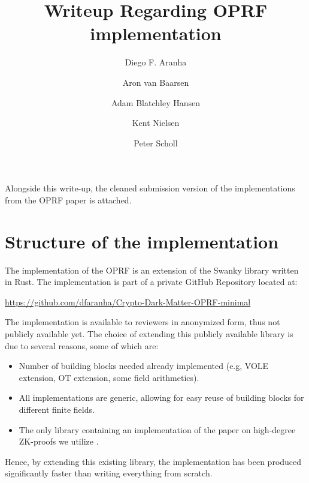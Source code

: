 \documentclass{article}
\title{Writeup Regarding OPRF implementation}
\author{Diego F. Aranha \and Aron van Baarsen \and Adam Blatchley Hansen \and Kent Nielsen \and Peter Scholl}
\begin{document}
\maketitle

Alongside this write-up, the cleaned submission version of the implementations from the OPRF paper is attached.

\section{Structure of the implementation}
The implementation of the OPRF is an extension of the Swanky library \cite{swanky} written in Rust.
The implementation is part of a private GitHub Repository located at:
\begin{center}
    \url{https://github.com/dfaranha/Crypto-Dark-Matter-OPRF-minimal}
\end{center}
The implementation is available to reviewers in anonymized form, thus not publicly available yet. 
The choice of extending this publicly available library is due to several reasons, some of which are:
\begin{itemize}
    \item Number of building blocks needed already implemented (e.g, VOLE extension, OT extension, some field arithmetics).
    \item All implementations are generic, allowing for easy reuse of building blocks for different finite fields.
    \item The only library containing an implementation of the paper on high-degree ZK-proofs we utilize \cite{conversions}.
\end{itemize}
Hence, by extending this existing library, the implementation has been produced significantly faster than writing everything from scratch.
\end{document}
